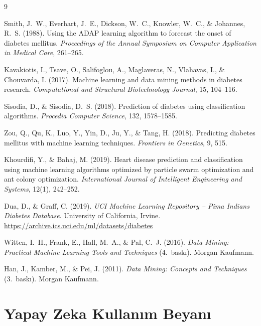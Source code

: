 \documentclass[12pt,a4paper]{article}
\begin{document}
\newpage
\begin{thebibliography}{9}

Smith, J.~W., Everhart, J.~E., Dickson, W.~C., Knowler, W.~C., \& Johannes, R.~S. (1988).
Using the ADAP learning algorithm to forecast the onset of diabetes mellitus.
\textit{Proceedings of the Annual Symposium on Computer Application in Medical Care}, 261--265.

Kavakiotis, I., Tsave, O., Salifoglou, A., Maglaveras, N., Vlahavas, I., \& Chouvarda, I. (2017).
Machine learning and data mining methods in diabetes research.
\textit{Computational and Structural Biotechnology Journal}, 15, 104--116.

Sisodia, D., \& Sisodia, D.~S. (2018).
Prediction of diabetes using classification algorithms.
\textit{Procedia Computer Science}, 132, 1578--1585.

Zou, Q., Qu, K., Luo, Y., Yin, D., Ju, Y., \& Tang, H. (2018).
Predicting diabetes mellitus with machine learning techniques.
\textit{Frontiers in Genetics}, 9, 515.

Khourdifi, Y., \& Bahaj, M. (2019).
Heart disease prediction and classification using machine learning algorithms
optimized by particle swarm optimization and ant colony optimization.
\textit{International Journal of Intelligent Engineering and Systems}, 12(1), 242--252.

Dua, D., \& Graff, C. (2019).
\textit{UCI Machine Learning Repository -- Pima Indians Diabetes Database}.
University of California, Irvine.
\url{https://archive.ics.uci.edu/ml/datasets/diabetes}

Witten, I.~H., Frank, E., Hall, M.~A., \& Pal, C.~J. (2016).
\textit{Data Mining: Practical Machine Learning Tools and Techniques} (4.~baskı).
Morgan Kaufmann.

Han, J., Kamber, M., \& Pei, J. (2011).
\textit{Data Mining: Concepts and Techniques} (3.~baskı).
Morgan Kaufmann.

\end{thebibliography}

\newpage
\section*{Yapay Zeka Kullanım Beyanı}
\end{document}
